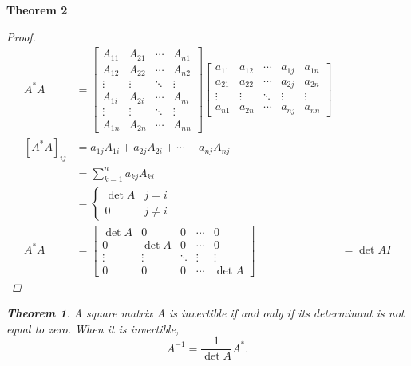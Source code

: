 \documentclass{article}
\newtheorem{theorem}{Theorem}[section]
\theoremstyle{definition}
\begin{document}
\begin{theorem}
\begin{proof}
    \begin{align*}
        A^{*}A
        &=
        \begin{bmatrix}
            A_{11} & A_{21} & \cdots & A_{n1}\\
            A_{12} & A_{22} & \cdots & A_{n2}\\
            \vdots & \vdots & \ddots & \vdots\\
            A_{1i} & A_{2i} & \cdots & A_{ni}\\
            \vdots & \vdots & \ddots & \vdots\\
            A_{1n} & A_{2n} & \cdots & A_{nn}
        \end{bmatrix}
        \begin{bmatrix}
            a_{11}&a_{12} & \cdots & a_{1j} & a_{1n}\\
            a_{21} & a_{22} & \cdots & a_{2j} & a_{2n}\\
            \vdots & \vdots & \ddots & \vdots & \vdots\\
            a_{n1} & a_{2n} & \cdots & a_{nj} & a_{nn}
        \end{bmatrix}\\
        [A^{*}A]_{ij}&=
        a_{1j}A_{1i}+a_{2j}A_{2i}+\cdots+a_{nj}A_{nj}\\
        &=\sum_{k=1}^{n}a_{kj}A_{ki}\\
        &=\begin{cases}
            \det{A} & j=i\\
            0 & j\neq i
        \end{cases}\\
        A^{*}A&=
        \begin{bmatrix}
            \det{A} & 0 & 0 & \cdots & 0\\
            0 & \det{A} & 0 & \cdots & 0\\
            \vdots & \vdots & \ddots & \vdots & \vdots\\
            0 & 0 & 0 & \cdots & \det{A}
        \end{bmatrix}
        &=
        \det A I
    \end{align*}
\end{proof} 

\begin{theorem}
    A square matrix $A$ is invertible if and 
    only if its determinant is not equal to zero.
    When it is invertible,
    $$A^{-1}=\frac{1}{\det A}A^{*}.$$
\end{theorem}


\end{theorem}
\end{document}
